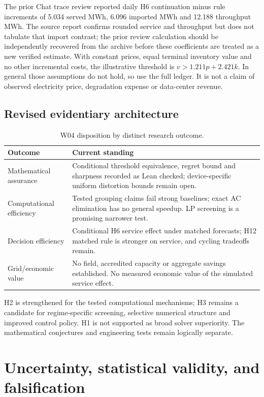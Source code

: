 \documentclass[11pt,letterpaper]{article}
\begin{document}
The prior Chat trace review reported daily H6 continuation minus rule increments of 5.034 served MWh, 6.096 imported MWh and 12.188 throughput MWh. The source report confirms rounded service and throughput but does not tabulate that import contrast; the prior review calculation should be independently recovered from the archive before these coefficients are treated as a new verified estimate. With constant prices, equal terminal inventory value and no other incremental costs, the illustrative threshold is $v>1.211p+2.421k$. In general those assumptions do not hold, so use the full ledger. It is not a claim of observed electricity price, degradation expense or data-center revenue.

\subsection{Revised evidentiary architecture}
\begin{table}[htbp]\centering\small
\caption{W04 disposition by distinct research outcome.}
\begin{tabularx}{\linewidth}{P{.23\linewidth}Y}\toprule
Outcome & Current standing\\\midrule
Mathematical assurance & Conditional threshold equivalence, regret bound and sharpness recorded as Lean checked; device-specific uniform distortion bounds remain open.\\
Computational efficiency & Tested grouping claims fail strong baselines; exact AC elimination has no general speedup. LP screening is a promising narrower test.\\
Decision efficiency & Conditional H6 service effect under matched forecasts; H12 matched rule is stronger on service, and cycling tradeoffs remain.\\
Grid/economic value & No field, accredited capacity or aggregate savings established. No measured economic value of the simulated service effect.\\\bottomrule
\end{tabularx}
\end{table}
H2 is strengthened for the tested computational mechanisms; H3 remains a candidate for regime-specific screening, selective numerical structure and improved control policy. H1 is not supported as broad solver superiority. The mathematical conjectures and engineering tests remain logically separate.

\section{Uncertainty, statistical validity, and falsification}
\label{sec:uncertainty}
\end{document}
